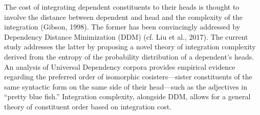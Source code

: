 The cost of integrating dependent constituents to their heads is thought to involve the distance between dependent and head and the complexity of the integration (Gibson, 1998). The former has been convincingly addressed by Dependency Distance Minimization (DDM) (cf. Liu et al., 2017). The current study addresses the latter by proposing a novel theory of integration complexity derived from the entropy of the probability distribution of a dependent's heads. An analysis of Universal Dependency corpora provides empirical evidence regarding the preferred order of isomorphic cosisters—sister constituents of the same syntactic form on the same side of their head—such as the adjectives in ``pretty blue fish.'' Integration complexity, alongside DDM, allows for a general theory of constituent order based on integration cost.
